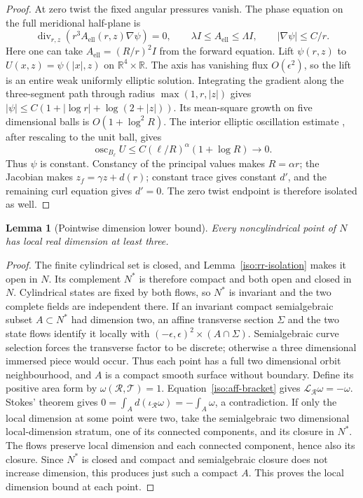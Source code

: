 \documentclass[11pt,a4paper]{article}
\numberwithin{equation}{section}
\theoremstyle{plain}
\newtheorem{lemma}[theorem]{Lemma}
\theoremstyle{definition}
\theoremstyle{remark}
\begin{document}
\begin{proof}
At zero twist the fixed angular pressures vanish.  The
phase equation on the full meridional half-plane is
\begin{equation}\label{iso:zero-twist-phase}
 \operatorname{div}_{r,z}(r^3A_{\mathrm{ell}}(r,z)\nabla\psi)=0,
 \qquad \lambda I\le A_{\mathrm{ell}}\le\Lambda I,
 \qquad |\nabla\psi|\le C/r.
\end{equation}
Here one can take $A_{\mathrm{ell}}=(R/r)^2I$ from the forward equation.
Lift $\psi(r,z)$ to $U(x,z)=\psi(|x|,z)$ on $\mathbb R^4\times\mathbb R$.
The axis has vanishing flux $O(\epsilon^2)$, so the lift is an entire
weak uniformly elliptic solution.  Integrating the gradient along the
three-segment path through radius $\max(1,r,|z|)$ gives
$|\psi|\le C(1+|\log r|+\log(2+|z|))$.
Its mean-square growth on five dimensional balls is $O(1+\log^2R)$.
The interior elliptic oscillation estimate
\cite[Theorems~8.17 and~8.22]{GilbargTrudinger2001}, after rescaling to the unit ball, gives
\[
 \operatorname{osc}_{B_\ell}U\le C(\ell/R)^\alpha(1+\log R)\longrightarrow0.
\]
Thus $\psi$ is constant.  Constancy of the principal values makes $R=\alpha r$;
the Jacobian makes $z_f=\gamma z+d(r)$; constant trace gives constant $d'$,
and the remaining curl equation gives $d'=0$.  The zero twist endpoint
is therefore isolated as well.  
\end{proof}

\begin{lemma}[Pointwise dimension lower bound]\label{iso:dimension-lower}
Every noncylindrical point of $N$ has local real dimension at least three.
\end{lemma}
\begin{proof}
The finite cylindrical set is closed, and
Lemma~\ref{iso:rr-isolation} makes it open in $N$. Its complement $N^*$ is
therefore compact and both open and closed in $N$. Cylindrical states are
fixed by both flows, so $N^*$ is invariant and the two complete fields are
independent there. If an invariant compact
semialgebraic subset $A\subset N^*$ had
dimension two, an affine transverse section $\Sigma$ and the two state
flows identify it locally with
$(-\epsilon,\epsilon)^2\times(A\cap\Sigma)$.  Semialgebraic curve
selection forces the transverse factor to be discrete; otherwise a
three dimensional immersed piece would occur. Thus each point has a full
two dimensional orbit neighbourhood, and $A$ is a compact smooth surface
without boundary. Define its positive area form by
$\omega(\mathcal R,\mathcal T)=1$.  Equation~\eqref{iso:aff-bracket} gives
$\mathcal L_{\mathcal R}\omega=-\omega$.
Stokes' theorem gives $0=\int_A d(\iota_{\mathcal R}\omega)=-\int_A\omega$,
a contradiction.
If only the local dimension at some point were two, take the semialgebraic
two dimensional local-dimension stratum, one of its connected components,
and its closure in $N^*$. The flows preserve local dimension and each
connected component, hence also its closure. Since $N^*$ is closed and
compact and semialgebraic closure does not increase dimension, this produces just such a
compact $A$.  This proves the local dimension bound at each point.
\end{proof}
\end{document}
